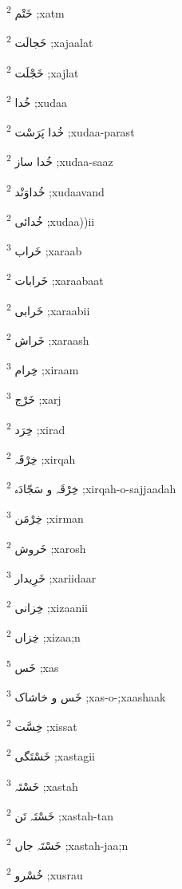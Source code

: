 \documentclass[12pt]{article}
\begin{document}
\begin{multicols}{5}
{\ur خَتْم}   \textsuperscript{2} ;xatm

{\ur خَجالَت}   \textsuperscript{2} ;xajaalat

{\ur خَجْلَت}   \textsuperscript{2} ;xajlat

{\ur خُدا}   \textsuperscript{2} ;xudaa

{\ur خُدا پَرَسْت}   \textsuperscript{2} ;xudaa-parast

{\ur خُدا ساز}   \textsuperscript{2} ;xudaa-saaz

{\ur خُداوَنْد}   \textsuperscript{2} ;xudaavand

{\ur خُدائی}   \textsuperscript{2} ;xudaa))ii

{\ur خَراب}   \textsuperscript{3} ;xaraab

{\ur خَرابات}   \textsuperscript{2} ;xaraabaat

{\ur خَرابی}   \textsuperscript{2} ;xaraabii

{\ur خَراش}   \textsuperscript{2} ;xaraash

{\ur خِرام}   \textsuperscript{3} ;xiraam

{\ur خَرْج}   \textsuperscript{3} ;xarj

{\ur خِرَد}   \textsuperscript{2} ;xirad

{\ur خِرْقَہ}   \textsuperscript{2} ;xirqah

{\ur خِرْقَہ و سَجّادَہ}   \textsuperscript{2} ;xirqah-o-sajjaadah

{\ur خِرْمَن}   \textsuperscript{3} ;xirman

{\ur خَروش}   \textsuperscript{2} ;xarosh

{\ur خَرِیدار}   \textsuperscript{3} ;xariidaar

{\ur خِزانی}   \textsuperscript{2} ;xizaanii

{\ur خِزاں}   \textsuperscript{2} ;xizaa;n

{\ur خَس}   \textsuperscript{5} ;xas

{\ur خَس و خاشاک}   \textsuperscript{3} ;xas-o-;xaashaak

{\ur خِسَّت}   \textsuperscript{2} ;xissat

{\ur خَسْتَگی}   \textsuperscript{2} ;xastagii

{\ur خَسْتَہ}   \textsuperscript{3} ;xastah

{\ur خَسْتَہ تَن}   \textsuperscript{2} ;xastah-tan

{\ur خَسْتَہ جاں}   \textsuperscript{2} ;xastah-jaa;n

{\ur خُسْرو}   \textsuperscript{2} ;xusrau


\end{multicols}
\end{document}
